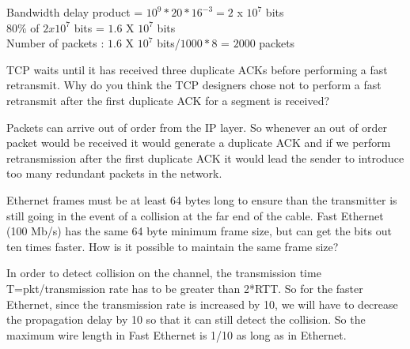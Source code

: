 \documentclass[answers,addpoints]{exam}
\begin{document}
\begin{questions}

\begin{solution}
Bandwidth delay product = $10^9 * 20 * 16^{-3} = 2$ x $10^7$ bits\\
$80 \%$ of $2 x 10^7$ bits = $1.6$ X $10^7$ bits\\
Number of packets : $1.6$ X $10^7$ bits/$1000*8$ = $2000$ packets

\end{solution}

\question
TCP waits until it has received three duplicate ACKs before performing a fast retransmit. Why do you think the TCP designers chose not to perform a fast retransmit after the first duplicate ACK for a segment is received?
\fillwithdottedlines{1in}

\begin{solution}
Packets can arrive out of order from the IP layer. So whenever an out of order packet would be received it would generate a duplicate ACK and if we perform retransmission after the first duplicate ACK it would lead the sender to introduce too many redundant packets in the network.
\end{solution}

\question
Ethernet frames must be at least 64 bytes long to ensure than the transmitter is still going in the event of a collision at the far end of the cable. Fast Ethernet (100 Mb/s) has the same 64 byte minimum frame size, but can get the bits out ten times faster. How is it possible to maintain the same frame size?
\fillwithdottedlines{1in}

\begin{solution}
In order to detect collision on the channel, the transmission time T=pkt/transmission rate has to be greater than 2*RTT. So for the faster Ethernet, since the transmission rate is increased by 10, we will have to decrease the propagation delay by 10 so that it can still detect the collision. So the maximum wire length in Fast Ethernet is 1/10 as long as in Ethernet.

\end{solution}



\end{questions}
\end{document}

